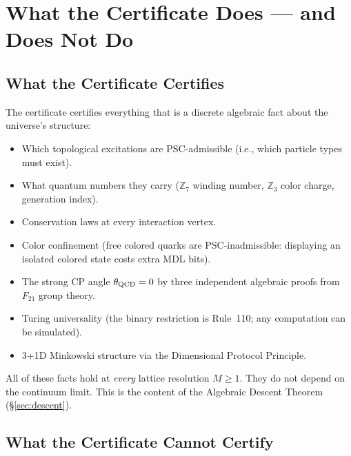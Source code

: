 \documentclass[11pt,a4paper]{article}
\newcommand{\ZS}{\mathbb{Z}_7}
\begin{document}
\section{What the Certificate Does --- and Does Not Do}
\label{sec:cert}

\subsection{What the Certificate Certifies}

The certificate certifies everything that is a discrete algebraic fact
about the universe's structure:

\begin{itemize}[itemsep=5pt]
  \item Which topological excitations are PSC-admissible (i.e., which
    particle types must exist).
  \item What quantum numbers they carry ($\ZS$ winding number,
    $\mathbb{Z}_3$ color charge, generation index).
  \item Conservation laws at every interaction vertex.
  \item Color confinement (free colored quarks are PSC-inadmissible:
    displaying an isolated colored state costs extra MDL bits).
  \item The strong CP angle $\theta_{\rm QCD} = 0$ by three independent
    algebraic proofs from $F_{21}$ group theory.
  \item Turing universality (the binary restriction is Rule~110;
    any computation can be simulated).
  \item 3+1D Minkowski structure via the Dimensional Protocol Principle.
\end{itemize}

All of these facts hold at \emph{every} lattice resolution $M \geq 1$.
They do not depend on the continuum limit.
This is the content of the Algebraic Descent Theorem (\S\ref{sec:descent}).

\subsection{What the Certificate Cannot Certify}
\label{sec:cert_cannot}
\end{document}
